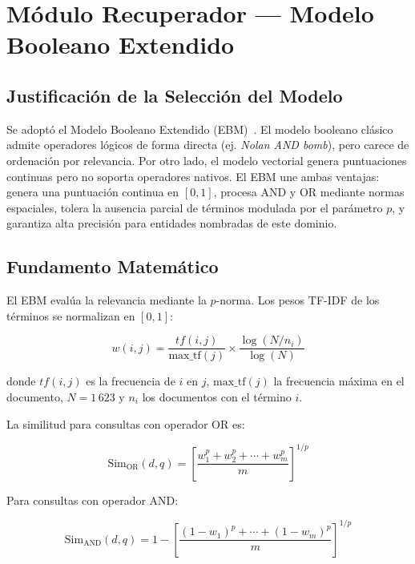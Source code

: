 \documentclass[10pt,a4paper]{llncs}
\begin{document}
\section{Módulo Recuperador --- Modelo Booleano Extendido}

\subsection{Justificación de la Selección del Modelo}

Se adoptó el Modelo Booleano Extendido (EBM)~\cite{salton1983extended,baezayates2011modern}. El modelo booleano clásico admite operadores lógicos de forma directa (ej. \textit{Nolan AND bomb}), pero carece de ordenación por relevancia. Por otro lado, el modelo vectorial genera puntuaciones continuas pero no soporta operadores nativos. El EBM une ambas ventajas: genera una puntuación continua en $[0, 1]$, procesa AND y OR mediante normas espaciales, tolera la ausencia parcial de términos modulada por el parámetro $p$, y garantiza alta precisión para entidades nombradas de este dominio.

\subsection{Fundamento Matemático}

El EBM evalúa la relevancia mediante la $p$-norma. Los pesos TF-IDF de los términos se normalizan en $[0,1]$:

\begin{equation}
w(i,j) = \frac{tf(i,j)}{\text{max\_tf}(j)} \times \frac{\log(N/n_i)}{\log(N)}
\label{eq:tfidf}
\end{equation}

donde $tf(i,j)$ es la frecuencia de $i$ en $j$, $\text{max\_tf}(j)$ la frecuencia máxima en el documento, $N=1\,623$ y $n_i$ los documentos con el término $i$.

La similitud para consultas con operador OR es:

\begin{equation}
\text{Sim}_{\text{OR}}(d,q) = \left[\frac{w_1^p + w_2^p + \cdots + w_m^p}{m}\right]^{1/p}
\label{eq:or}
\end{equation}

Para consultas con operador AND:

\begin{equation}
\text{Sim}_{\text{AND}}(d,q) = 1 - \left[\frac{(1-w_1)^p + \cdots + (1-w_m)^p}{m}\right]^{1/p}
\label{eq:and}
\end{equation}
\end{document}
